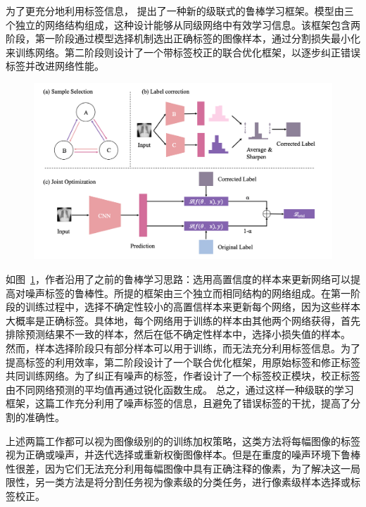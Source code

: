 为了更充分地利用标签信息，\citet{Xue2020CascadedRL} 提出了一种新的级联式的鲁棒学习框架。模型由三个独立的网络结构组成，这种设计能够从同级网络中有效学习信息。该框架包含两阶段，第一阶段通过模型选择机制选出正确标签的图像样本，通过分割损失最小化来训练网络。第二阶段则设计了一个带标签校正的联合优化框架，以逐步纠正错误标签并改进网络性能。
    \begin{figure}[tbp]
        \centering 
        \includegraphics[width=1.0\textwidth]{img/c2/rel_c2.png}
        \label{c2_fig12}
    \end{figure}
如图~\ref{c2_fig12}，作者沿用了之前的鲁棒学习思路：选用高置信度的样本来更新网络可以提高对噪声标签的鲁棒性。所提的框架由三个独立而相同结构的网络组成。在第一阶段的训练过程中，选择不确定性较小的高置信样本来更新每个网络，因为这些样本大概率是正确标签。具体地，每个网络用于训练的样本由其他两个网络获得，首先排除预测结果不一致的样本，然后在低不确定性样本中，选择小损失值的样本。
然而，样本选择阶段只有部分样本可以用于训练，而无法充分利用标签信息。为了提高标签的利用效率，第二阶段设计了一个联合优化框架，用原始标签和修正标签共同训练网络。为了纠正有噪声的标签，作者设计了一个标签校正模块，校正标签由不同网络预测的平均值再通过锐化函数生成。
总之，通过这样一种级联的学习框架，这篇工作充分利用了噪声标签的信息，且避免了错误标签的干扰，提高了分割的准确性。


上述两篇工作都可以视为图像级别的的训练加权策略，这类方法将每幅图像的标签视为正确或噪声，并迭代选择或重新权衡图像样本。但是在重度的噪声环境下鲁棒性很差，因为它们无法充分利用每幅图像中具有正确注释的像素，为了解决这一局限性，另一类方法是将分割任务视为像素级的分类任务，进行像素级样本选择或标签校正。

